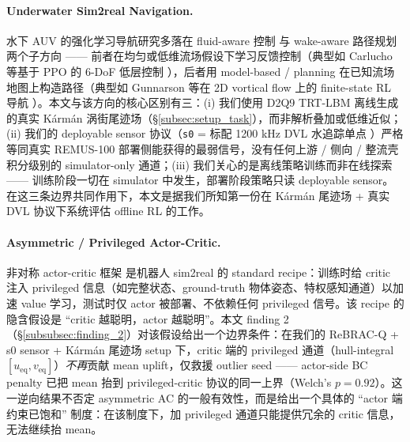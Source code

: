 \paragraph{Underwater Sim2real Navigation.}
水下 AUV 的强化学习导航研究多落在 fluid-aware 控制 \citep{carlucho2018ras, yu2017auv} 与 wake-aware 路径规划 \citep{verma2018pnas, gunnarson2021ncomm} 两个子方向 —— 前者在均匀或低维流场假设下学习反馈控制（典型如 Carlucho 等基于 PPO 的 6-DoF 低层控制 \citep{carlucho2018ras}），后者用 model-based / planning 在已知流场地图上构造路径（典型如 Gunnarson 等在 2D vortical flow 上的 finite-state RL 导航 \citep{gunnarson2021ncomm}）。本文与该方向的核心区别有三：(i) 我们使用 D2Q9 TRT-LBM 离线生成的真实 Kármán 涡街尾迹场（\S\ref{subsec:setup_task}），而非解析叠加或低维近似；(ii) 我们的 deployable sensor 协议（\texttt{s0} = 标配 1200 kHz DVL 水追踪单点 \citep{fossen2011handbook}）严格等同真实 REMUS-100 部署侧能获得的最弱信号，没有任何上游 / 侧向 / 整流壳积分级别的 simulator-only 通道；(iii) 我们关心的是离线策略训练而非在线探索 —— 训练阶段一切在 simulator 中发生，部署阶段策略只读 deployable sensor。在这三条边界共同作用下，本文是据我们所知第一份在 Kármán 尾迹场 + 真实 DVL 协议下系统评估 offline RL 的工作。

\paragraph{Asymmetric / Privileged Actor-Critic.}
非对称 actor-critic 框架 \citep{pinto2017asymmetric} 是机器人 sim2real 的 standard recipe：训练时给 critic 注入 privileged 信息（如完整状态、ground-truth 物体姿态、特权感知通道）以加速 value 学习，测试时仅 actor 被部署、不依赖任何 privileged 信号。该 recipe 的隐含假设是 ``critic 越聪明，actor 越聪明''。本文 finding 2（\S\ref{subsubsec:finding_2}）对该假设给出一个边界条件：在我们的 ReBRAC-Q + s0 sensor + Kármán 尾迹场 setup 下，critic 端的 privileged 通道（hull-integral $[u_{\mathrm{eq}}, v_{\mathrm{eq}}]$）\emph{不再}贡献 mean uplift，仅救援 outlier seed —— actor-side BC penalty 已把 mean 抬到 privileged-critic 协议的同一上界（Welch's $p = 0.92$）。这一逆向结果不否定 asymmetric AC 的一般有效性，而是给出一个具体的 ``actor 端约束已饱和'' 制度：在该制度下，加 privileged 通道只能提供冗余的 critic 信息，无法继续抬 mean。
